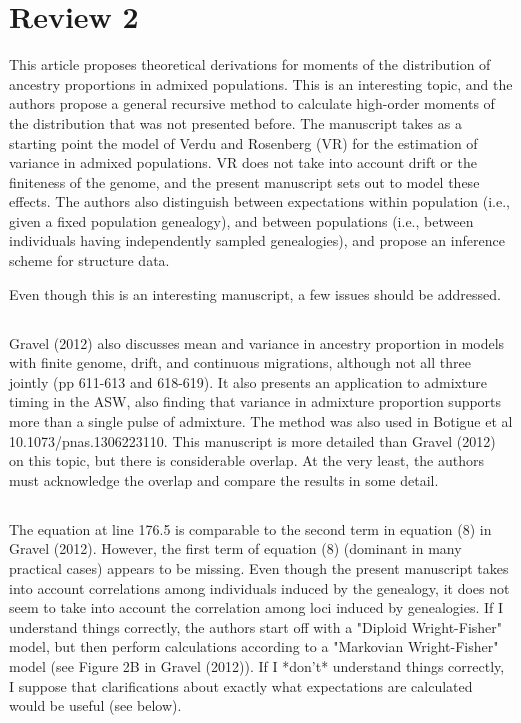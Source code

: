 \documentclass[11pt]{amsart}
\begin{document}
\section{Review 2} This article proposes theoretical derivations for moments of
the distribution of ancestry proportions in admixed populations. This is an
interesting topic, and the authors propose a general recursive method to
calculate high-order moments of the distribution that was not presented before.
The manuscript takes as a starting point the model of Verdu and Rosenberg (VR)
for the estimation of variance in admixed populations. VR does not take into
account drift or the finiteness of the genome, and the present manuscript sets
out to model these effects. The authors also distinguish between expectations
within population (i.e., given a fixed population genealogy), and between
populations (i.e., between individuals having independently sampled
genealogies), and propose an inference scheme for structure data.

Even though this is an interesting manuscript, a few issues should be
addressed.\\

\subsection{} Gravel (2012) also discusses mean and variance in ancestry
proportion in models with finite genome, drift, and continuous migrations,
although not all three jointly (pp 611-613 and 618-619). It also presents an
application to admixture timing in the ASW, also finding that variance in
admixture proportion supports more than a single pulse of admixture. The method
was also used in Botigue et al 10.1073/pnas.1306223110. This manuscript is more
detailed than Gravel (2012) on this topic, but there is considerable overlap. At
the very least, the authors must acknowledge the overlap and compare the results
in some detail.\\
\subsection{} The equation at line 176.5 is comparable to the second term in
equation (8) in Gravel (2012). However, the first term of equation (8) (dominant
in many practical cases) appears to be missing. Even though the present
manuscript takes into account correlations among individuals induced by the
genealogy, it does not seem to take into account the correlation among loci
induced by genealogies. If I understand things correctly, the authors start off
with a "Diploid Wright-Fisher" model, but then perform calculations according to
a "Markovian Wright-Fisher" model (see Figure 2B in Gravel (2012)). If I *don't*
understand things correctly, I suppose that clarifications about exactly what
expectations are calculated would be useful (see below).
\end{document}
